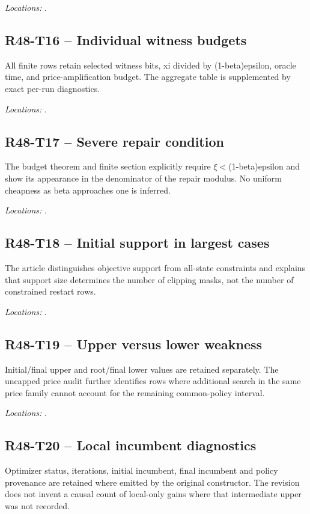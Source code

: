 \noindent\emph{Locations:} .

\subsection{R48-T16 -- Individual witness budgets}
All finite rows retain selected witness bits, xi divided by (1-beta)epsilon, oracle time, and price-amplification budget. The aggregate table is supplemented by exact per-run diagnostics.

\noindent\emph{Locations:} .

\subsection{R48-T17 -- Severe repair condition}
The budget theorem and finite section explicitly require $\xi<$(1-beta)epsilon and show its appearance in the denominator of the repair modulus. No uniform cheapness as beta approaches one is inferred.

\noindent\emph{Locations:} .

\subsection{R48-T18 -- Initial support in largest cases}
The article distinguishes objective support from all-state constraints and explains that support size determines the number of clipping masks, not the number of constrained restart rows.

\noindent\emph{Locations:} .

\subsection{R48-T19 -- Upper versus lower weakness}
Initial/final upper and root/final lower values are retained separately. The uncapped price audit further identifies rows where additional search in the same price family cannot account for the remaining common-policy interval.

\noindent\emph{Locations:} .

\subsection{R48-T20 -- Local incumbent diagnostics}
Optimizer status, iterations, initial incumbent, final incumbent and policy provenance are retained where emitted by the original constructor. The revision does not invent a causal count of local-only gains where that intermediate upper was not recorded.

